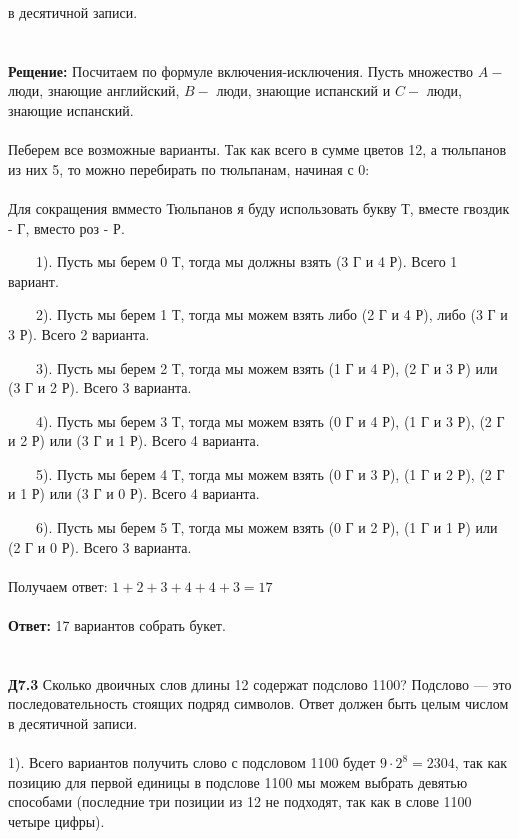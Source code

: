 \documentclass[a4paper, 12pt]{article}
\begin{document}
    в десятичной записи.
    \\
    \\
    \\ \textbf{Рещение: } Посчитаем по формуле включения-исключения. Пусть множество $A  - $ люди, знающие английский, $B - $ люди, знающие испанский и $C -$ люди, знающие испанский.
    \\
    \\ Пеберем все возможные варианты. Так как всего в сумме цветов 12, а тюльпанов из них 5, то можно перебирать по тюльпанам, начиная с 0:
    \\
    \\ Для сокращения вмместо Тюльпанов я буду использовать букву Т, вместе гвоздик - Г, вместо роз - Р.
    \\
    \par \ \ \ \ 1). Пусть мы берем 0 Т, тогда мы должны взять (3 Г и 4 Р). Всего 1 вариант.
    \par \ \ \ \ 2). Пусть мы берем 1 Т, тогда мы можем взять либо (2 Г и 4 Р), либо (3 Г и 3 Р). Всего 2 варианта.
    \par \ \ \ \ 3). Пусть мы берем 2 Т, тогда мы можем взять (1 Г и 4 Р), (2 Г и 3 Р) или (3 Г и 2 Р). Всего 3 варианта.
    \par \ \ \ \ 4). Пусть мы берем 3 Т, тогда мы можем взять (0 Г и 4 Р), (1 Г и 3 Р), (2 Г и 2 Р) или (3 Г и 1 Р). Всего 4 варианта.
    \par \ \ \ \ 5). Пусть мы берем 4 Т, тогда мы можем взять (0 Г и 3 Р), (1 Г и 2 Р), (2 Г и 1 Р) или (3 Г и 0 Р). Всего 4 варианта.
    \par \ \ \ \ 6). Пусть мы берем 5 Т, тогда мы можем взять (0 Г и 2 Р), (1 Г и 1 Р) или (2 Г и 0 Р). Всего 3 варианта.
    \\
    \\ Получаем ответ: $1 + 2 + 3 + 4 + 4 + 3 = 17$
    \\
    \\ \textbf{Ответ: } 17 вариантов собрать букет.
    \\
    \\
    \\ \textbf{Д7.3} Сколько двоичных слов длины 12 содержат подслово 1100? Подслово — это последовательность
    стоящих подряд символов. Ответ должен быть целым числом в десятичной записи.
    \\
    \\ 1). Всего вариантов получить слово с подсловом 1100 будет $9 \cdot 2^8  = 2304$, так как позицию для первой 
    единицы в подслове 1100 мы можем выбрать девятью способами (последние три позиции из 12 не подходят, так как в слове 1100 четыре цифры).
\end{document}
